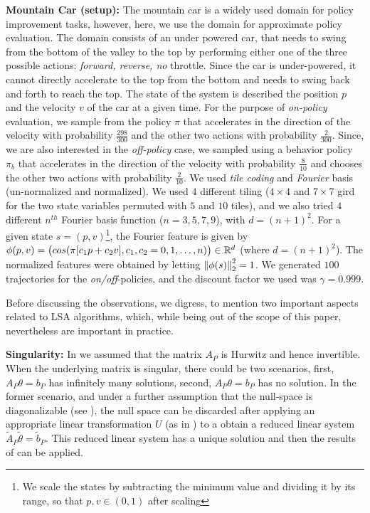 \textbf{Mountain Car (setup):}  The mountain car is a widely used domain for policy improvement tasks, however, here, we use the domain for approximate policy evaluation. The domain consists of an under powered car, that needs to swing from the bottom of the valley to the top by performing either one of the three possible actions: \emph{forward, reverse, no} throttle. Since the car is under-powered, it cannot directly accelerate to the top from the bottom and needs to swing back and forth to reach the top. The state of the system is described the position $p$ and the velocity $v$ of the car at a given time. For the purpose of \emph{on-policy} evaluation, we sample from the policy $\pi$ that accelerates in the direction of the velocity with probability $\frac{298}{300}$ and the other two actions with probability $\frac{2}{300}$. Since, we are also interested in the \emph{off-policy} case, we sampled using a behavior policy  $\pi_b$ that accelerates in the direction of the velocity with probability $\frac{8}{10}$ and chooses the other two actions with probability $\frac{2}{10}$. We used \emph{tile coding} and \emph{Fourier} basis (un-normalized and normalized). We used $4$ different tiling ($4\times 4$ and $7\times 7$ gird for the two state variables permuted with $5$ and $10$ tiles), and we also tried $4$ different $n^{th}$ Fourier basis function ($n=3,5,7,9$), with $d=(n+1)^2$. For a given state $s=(p,v)$\footnote{We scale the states by subtracting the minimum value and dividing it by its range, so that $p,v\in(0,1)$ after scaling}, the Fourier feature is given by $\phi(p,v)=\big(cos(\pi [c_1p+c_2 v],c_1,c_2=0,1,\ldots,n)\big) \in \mathbb{R}^{d}$ (where $d=(n+1)^2$). The normalized features were obtained by letting $\left\| \phi(s)\right\|^2_2=1$. We generated $100$ trajectories for the \emph{on/off}-policies, and the discount factor we used was $\gamma=0.999$. 

Before discussing the observations, we digress, to mention two important aspects related to LSA algorithms, which, while being out of the scope of this paper, nevertheless are important in practice.

\textbf{Singularity:} In  we assumed that the matrix $A_P$ is Hurwitz and hence invertible. When the underlying matrix is singular, there could be two scenarios, first,  $A_P\theta=b_P$ has infinitely many solutions, second, $A_P\theta=b_P$ has no solution. In the former scenario, and under a further assumption that the null-space is diagonalizable (see \cite{bertstab}), the null space can be discarded after applying an appropriate linear transformation $U$ (as in ) to a obtain a reduced linear system $\tilde{A}_P\tilde{\theta}=\tilde{b}_P$. This reduced linear system has a unique solution and then the results of  can be applied.

